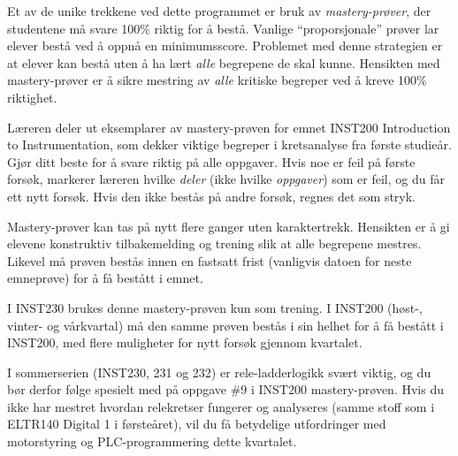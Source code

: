 

Et av de unike trekkene ved dette programmet er bruk av {\it mastery-prøver}, der studentene må svare 100\% riktig for å bestå. Vanlige ``proporsjonale'' prøver lar elever bestå ved å oppnå en minimumsscore. Problemet med denne strategien er at elever kan bestå uten å ha lært {\it alle} begrepene de skal kunne. Hensikten med mastery-prøver er å sikre mestring av {\it alle} kritiske begreper ved å kreve 100\% riktighet.

\vskip 10pt

Læreren deler ut eksemplarer av mastery-prøven for emnet INST200 Introduction to Instrumentation, som dekker viktige begreper i kretsanalyse fra første studieår. Gjør ditt beste for å svare riktig på alle oppgaver. Hvis noe er feil på første forsøk, markerer læreren hvilke {\it deler} (ikke hvilke {\it oppgaver}) som er feil, og du får ett nytt forsøk. Hvis den ikke bestås på andre forsøk, regnes det som stryk.

\vskip 10pt

Mastery-prøver kan tas på nytt flere ganger uten karaktertrekk. Hensikten er å gi elevene konstruktiv tilbakemelding og trening slik at alle begrepene mestres. Likevel må prøven bestås innen en fastsatt frist (vanligvis datoen for neste emneprøve) for å få bestått i emnet.

\vskip 10pt

I INST230 brukes denne mastery-prøven kun som trening. I INST200 (høst-, vinter- og vårkvartal) må den samme prøven bestås i sin helhet for å få bestått i INST200, med flere muligheter for nytt forsøk gjennom kvartalet.

\vskip 10pt

I sommerserien (INST230, 231 og 232) er rele-ladderlogikk svært viktig, og du bør derfor følge spesielt med på oppgave \#9 i INST200 mastery-prøven. Hvis du ikke har mestret hvordan relekretser fungerer og analyseres (samme stoff som i ELTR140 Digital 1 i førsteåret), vil du få betydelige utfordringer med motorstyring og PLC-programmering dette kvartalet.

\vskip 10pt







 









